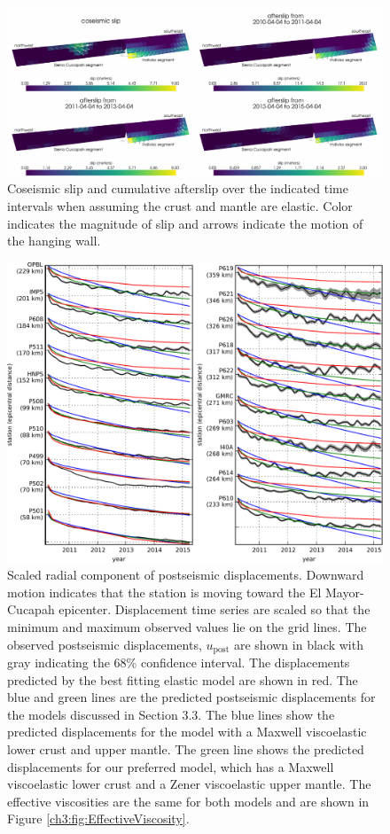 \begin{figure}\label{ch3:fig:ElasticSlip}
\includegraphics[scale=1.0]{ch3/figures/2016jb013114-p06}
\caption{Coseismic slip and cumulative afterslip over the indicated time intervals when assuming the crust and mantle are elastic.  Color indicates the magnitude of slip and arrows indicate the motion of the hanging wall.}
\end{figure}

\begin{figure}\label{ch3:fig:RecordSectionMain}
\includegraphics[scale=1.0]{ch3/figures/2016jb013114-p07}
\caption{Scaled radial component of postseismic displacements. Downward motion indicates that the station is moving toward the El Mayor-Cucapah epicenter.  Displacement time series are scaled so that the minimum and maximum observed values lie on the grid lines.  The observed postseismic displacements, $u_\mathrm{post}$ are shown in black with gray indicating the 68\% confidence interval.  The displacements predicted by the best fitting elastic model are shown in red.  The blue and green lines are the predicted postseismic displacements for the models discussed in Section 3.3. The blue lines show the predicted displacements for the model with a Maxwell viscoelastic lower crust and upper mantle.  The green line shows the predicted displacements for our preferred model, which has a Maxwell viscoelastic lower crust and a Zener viscoelastic upper mantle.  The effective viscosities are the same for both models and are shown in Figure \ref{ch3:fig:EffectiveViscosity}.}
\end{figure}


